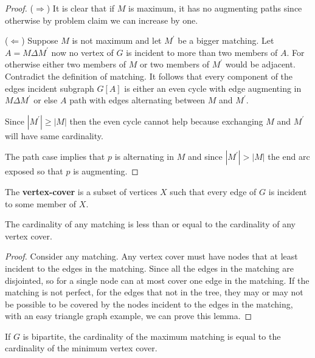             \begin{proof}
                ($\Rightarrow$) It is clear that if $M$ is maximum, it has no augmenting paths since otherwise by problem claim we can increase by one.

                ($\Leftarrow$) Suppose $M$ is not maximum and let $M^\prime$ be a bigger matching. Let $A = M \Delta M^\prime$ now no vertex of $G$ is incident to more than two members of $A$. For otherwise either two members of $M$ or two members of $M^\prime$ would be adjacent. Contradict the definition of matching. It follows that every component of the edges incident subgraph $G[A]$ is either an even cycle with edge augmenting in $M\Delta M^\prime$ or else $A$ path with edges alternating between $M$ and $M^\prime$.

                Since $|M^\prime| \ge |M|$ then the even cycle cannot help because exchanging $M$ and $M^\prime$ will have same cardinality.

                The path case implies that $p$ is alternating in $M$ and since $|M^\prime| > |M|$ the end arc exposed so that $p$ is augmenting.
            \end{proof}

            \begin{definition}
                The \textbf{vertex-cover} is a subset of vertices $X$ such that every edge of $G$ is incident to some member of $X$.
            \end{definition}

            \begin{lemma}
                The cardinality of any matching is less than or equal to the cardinality of any vertex cover.
            \end{lemma}

            \begin{proof}
                Consider any matching. Any vertex cover must have nodes that at least incident to the edges in the matching. Since all the edges in the matching are disjointed, so for a single node can at most cover one edge in the matching. If the matching is not perfect, for the edges that not in the tree, they may or may not be possible to be covered by the nodes incident to the edges in the matching, with an easy triangle graph example, we can prove this lemma.
            \end{proof}

            \begin{theorem}
                If $G$ is bipartite, the cardinality of the maximum matching is equal to the cardinality of the minimum vertex cover.
            \end{theorem}

